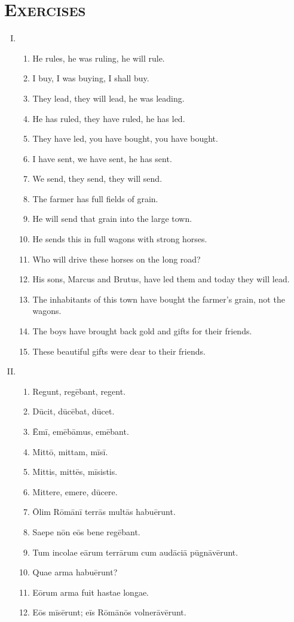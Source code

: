 \documentclass[12pt]{article}
\begin{document}
\section{\textsc{Exercises}}
\begin{enumerate}[I.]
	\setlength{\itemsep}{1em}
	\item \begin{enumerate}[1)]
		\item He rules, he was ruling, he will rule.
		\item I buy, I was buying, I shall buy.
		\item They lead, they will lead, he was leading.
		\item He has ruled, they have ruled, he has led.
		\item They have led, you have bought, you have bought.
		\item I have sent, we have sent, he has sent.
		\item We send, they send, they will send.
		\item The farmer has full fields of grain.
		\item He will send that grain into the large town.
		\item He sends this in full wagons with strong horses.
		\item Who will drive these horses on the long road?
		\item His sons, Marcus and Brutus, have led them and today they will lead.
		\item The inhabitants of this town have bought the farmer's grain, not the wagons.
		\item The boys have brought back gold and gifts for their friends.
		\item These beautiful gifts were dear to their friends.
	\end{enumerate}
	\item \begin{enumerate}[1)]
		\item Regunt, regēbant, regent.
		\item Dūcit, dūcēbat, dūcet.
		\item Ēmī, emēbāmus, emēbant.
		\item Mittō, mittam, mīsī.
		\item Mittis, mittēs, mīsistis.
		\item Mittere, emere, dūcere.
		\item Ōlim Rōmānī terrās multās habuērunt.
		\item Saepe nōn eōs bene regēbant.
		\item Tum incolae eārum terrārum cum audāciā pūgnāvērunt.
		\item Quae arma habuērunt?
		\item Eōrum arma fuit hastae longae.
		\item Eōs mīsērunt; eīs Rōmānōs volnerāvērunt.
	\end{enumerate}
\end{enumerate}
\end{document}

